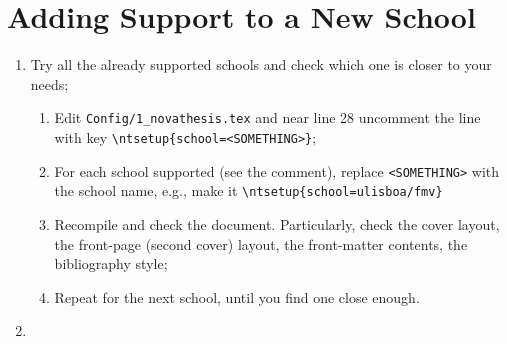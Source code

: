 
%

\chapter{Adding Support to a New School}
\label{cha:porting_novathesis}

\begin{enumerate}
  \item Try all the already supported schools and check which one is closer to your needs;
  \begin{enumerate}
    \item Edit \verb!Config/1_novathesis.tex! and near line 28 uncomment the line with key \verb!\ntsetup{school=<SOMETHING>}!;
    \item For each school supported (see the comment), replace \verb!<SOMETHING>! with the school name, e.g., make it \verb!\ntsetup{school=ulisboa/fmv}!
    \item Recompile and check the document.  Particularly, check the cover layout, the front-page (second cover) layout, the front-matter contents, the bibliography style;
    \item Repeat for the next school, until you find one close enough.
  \end{enumerate}
  \item 
\end{enumerate}
